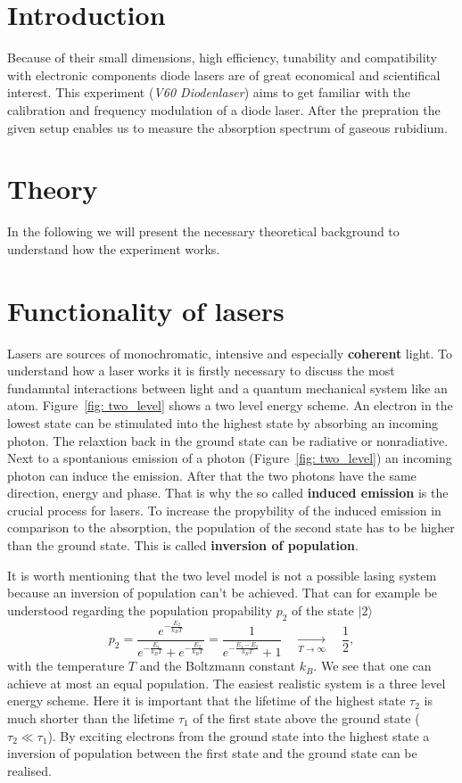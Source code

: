 \setcounter{page}{1}
\section*{Introduction}
Because of their small dimensions, high efficiency, tunability and compatibility with electronic components
diode lasers are of great economical and scientifical interest. This experiment (\emph{V60 Diodenlaser}) aims to get familiar
with the calibration and frequency modulation of a diode laser. After the prepration the given setup enables us to measure
the absorption spectrum of gaseous rubidium.

\section{Theory}
In the following we will present the necessary theoretical background to understand how the experiment works.



\section{Functionality of lasers}
Lasers are sources of monochromatic, intensive and especially \textbf{coherent} light.
To understand how a laser works it is firstly necessary to discuss the most fundamntal interactions between light and
a quantum mechanical system like an atom. Figure~\ref{fig: two_level} shows a two level energy scheme. An electron in the
lowest state can be stimulated into the highest state by absorbing an incoming photon. The relaxtion back in the
ground state can be radiative or nonradiative. Next to a spontanious emission of a photon (Figure~\ref{fig: two_level})
an incoming photon can induce the emission. After that the two photons have the same direction, energy and phase.
That is why the so called \textbf{induced emission} is the crucial process for lasers. To increase the propybility of the induced emission in
comparison to the absorption, the population of the second state has to be higher than the ground state. This is called
\textbf{inversion of population}.

It is worth mentioning that the two level model is not a possible lasing system because an inversion of population
can't be achieved. That can for example be understood
regarding the population propability $p_2$ of the state $|2\rangle$
\begin{equation}
  p_2 = \frac{e^{-\frac{E_2}{k_B T}}}{ e^{-\frac{E_1}{k_B T}} + e^{-\frac{E_2}{k_B T}} } =
  \frac{1}{ e^{-\frac{E_1 - E_2}{k_B T}} + 1}
    \quad \underset{T \rightarrow \infty}{\longrightarrow}\quad  \frac{1}{2},
\end{equation}
with the temperature $T$ and the Boltzmann constant $k_B$. We see that one can achieve at most an equal population. The easiest
realistic system is a three level energy scheme. Here it is important that the lifetime of the highest state $\tau_2$ is much shorter
than the lifetime $\tau_1$ of the first state above the ground state ($\tau_2 \ll \tau_1$). By exciting electrons from the ground state into the highest
state a inversion of population between the first state and the ground state can be realised.

